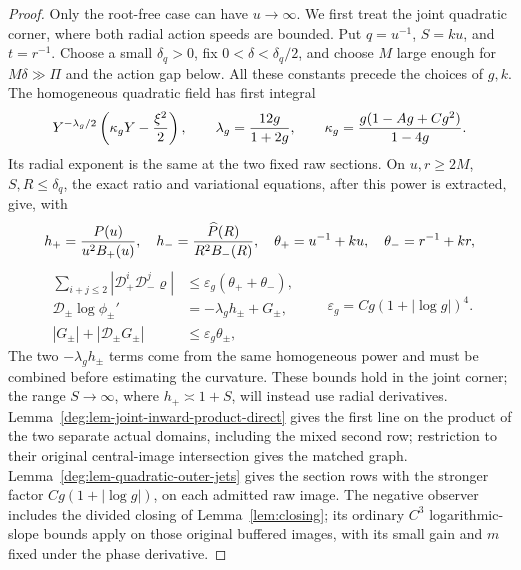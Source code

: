 \begin{proof}
Only the root-free case can have \(u\to\infty\).  We first treat the
joint quadratic corner, where both radial action speeds are bounded.
Put \(q=u^{-1}\), \(S=ku\), and \(t=r^{-1}\).  Choose a small
\(\delta_q>0\), fix \(0<\delta<\delta_q/2\), and choose \(M\) large enough for
\(M\delta\gg\Pi\) and the action gap below.  All these constants
precede the choices of \(g,k\).  The homogeneous quadratic field has
first integral
\[
 Y^{-\lambda_g/2}\left(\kappa_gY-{\xi^2\over2}\right),
 \qquad \lambda_g={12g\over1+2g},\qquad
 \kappa_g=\frac{g(1-Ag+Cg^2)}{1-4g}.
\]
Its radial exponent is the same at the two fixed raw sections.  On
\(u,r\ge2M\), \(S,R\le\delta_q\), the exact ratio and variational
equations, after this power is extracted, give, with
\[
 h_+={P(u)\over u^2B_+(u)},\quad
 h_-={\widehat P(R)\over R^2B_-(R)},\quad
 \theta_+=u^{-1}+ku,\quad \theta_-=r^{-1}+kr,
\]
\begin{equation}
 \begin{split}
 \sum_{i+j\le2}|\mathcal D_+^i\mathcal D_-^j\varrho|
 &\le\varepsilon_g(\theta_++\theta_-),\\
 \mathcal D_\pm\log\phi_\pm'&=-\lambda_gh_\pm+G_\pm,\\
 |G_\pm|+|\mathcal D_\pm G_\pm|&\le\varepsilon_g\theta_\pm,
 \end{split}
 \qquad \varepsilon_g=Cg(1+|\log g|)^4.
 \label{deg:quadratic-weighted-estimates}
\end{equation}
The two \(-\lambda_gh_\pm\) terms come from the same homogeneous
power and must be combined before estimating the curvature.
These bounds hold in the joint corner; the range \(S\to\infty\),
where \(h_+\asymp1+S\), will instead use radial derivatives.
Lemma~\ref{deg:lem-joint-inward-product-direct} gives the first
line on the product of the two separate actual domains, including
the mixed second row; restriction to their original central-image
intersection gives the matched graph. Lemma~\ref{deg:lem-quadratic-outer-jets}
gives the section rows with the stronger factor \(Cg(1+|\log g|)\),
on each admitted raw image.
The negative observer includes the divided closing of
Lemma~\ref{lem:closing}; its ordinary \(C^3\) logarithmic-slope
bounds apply on those original buffered images, with its small gain
and \(m\) fixed under the phase derivative.


\end{proof}
